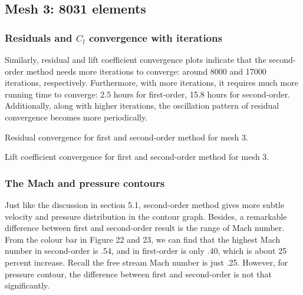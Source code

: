 \documentclass[letterpaper,onecolumn,12pt]{article}
\makeatletter
\newenvironment{figurehere}
  {\def\@captype{figure}}{}
\makeatother
\begin{document}
\subsection{Mesh 3: 8031 elements}
\subsubsection{Residuals and $C_l$ convergence with iterations}
Similarly, residual and lift coefficient convergence plots indicate that the second-order method needs more iterations to converge: around 8000 and 17000 iterations, respectively. Furthermore, with more iterations, it requires much more running time to converge: 2.5 hours for first-order, 15.8 hours for second-order. Additionally, along with higher iterations, the oscillation pattern of residual convergence becomes more periodically.

\begin{figurehere}
 \centering 
  \hspace{.05cm} 
  \caption{Residual convergence for first and second-order method for mesh 3.} 
\end{figurehere}

\begin{figurehere}
 \centering 
  \hspace{.05cm} 
  \caption{Lift coefficient convergence for first and second-order method for mesh 3.} 
\end{figurehere}


\subsubsection{The Mach and pressure contours}
Just like the discussion in section 5.1, second-order method gives more subtle velocity and pressure distribution in the contour graph. Besides, a remarkable difference between first and second-order result is the range of Mach number. From the colour bar in Figure 22 and 23, we can find that the highest Mach number in second-order is .54, and in first-order is only .40, which is about 25 percent increase. Recall the free stream Mach number is just .25. However, for pressure contour, the difference between first and second-order is not that significantly.
\end{document}
